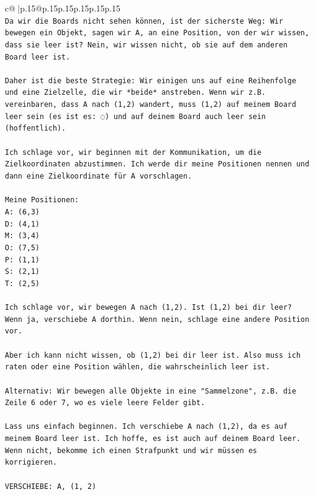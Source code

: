\documentclass{article}
\begin{document}
{\begin{supertabular}{c@{$\;$}|p{.15\linewidth}@{}p{.15\linewidth}p{.15\linewidth}p{.15\linewidth}p{.15\linewidth}p{.15\linewidth}}
{{{\\ 
\texttt{Da wir die Boards nicht sehen können, ist der sicherste Weg: Wir bewegen ein Objekt, sagen wir A, an eine Position, von der wir wissen, dass sie leer ist? Nein, wir wissen nicht, ob sie auf dem anderen Board leer ist.} \\
\\ 
\texttt{Daher ist die beste Strategie: Wir einigen uns auf eine Reihenfolge und eine Zielzelle, die wir *beide* anstreben. Wenn wir z.B. vereinbaren, dass A nach (1,2) wandert, muss (1,2) auf meinem Board leer sein (es ist es: ◌) und auf deinem Board auch leer sein (hoffentlich).} \\
\\ 
\texttt{Ich schlage vor, wir beginnen mit der Kommunikation, um die Zielkoordinaten abzustimmen. Ich werde dir meine Positionen nennen und dann eine Zielkoordinate für A vorschlagen.} \\
\\ 
\texttt{Meine Positionen:} \\
\texttt{A: (6,3)} \\
\texttt{D: (4,1)} \\
\texttt{M: (3,4)} \\
\texttt{O: (7,5)} \\
\texttt{P: (1,1)} \\
\texttt{S: (2,1)} \\
\texttt{T: (2,5)} \\
\\ 
\texttt{Ich schlage vor, wir bewegen A nach (1,2). Ist (1,2) bei dir leer? Wenn ja, verschiebe A dorthin. Wenn nein, schlage eine andere Position vor.} \\
\\ 
\texttt{Aber ich kann nicht wissen, ob (1,2) bei dir leer ist. Also muss ich raten oder eine Position wählen, die wahrscheinlich leer ist.} \\
\\ 
\texttt{Alternativ: Wir bewegen alle Objekte in eine "Sammelzone", z.B. die Zeile 6 oder 7, wo es viele leere Felder gibt.} \\
\\ 
\texttt{Lass uns einfach beginnen. Ich verschiebe A nach (1,2), da es auf meinem Board leer ist. Ich hoffe, es ist auch auf deinem Board leer. Wenn nicht, bekomme ich einen Strafpunkt und wir müssen es korrigieren.} \\
\\ 
\texttt{VERSCHIEBE: A, (1, 2)} \\
            }
        }
    }
     \\ \\


\end{supertabular}}
\end{document}
